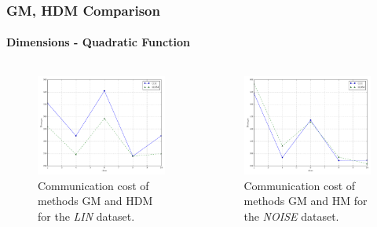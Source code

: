 \documentclass[hyperref={pdfpagelabels=false}]{beamer}
\begin{document}
\begin{frame} \frametitle{GM, HDM Comparison}\framesubtitle{Dimensions - Quadratic Function}
\begin{columns}
\begin{column}[t]{0.5\linewidth}
\begin{figure}
\vspace{-1cm}
\centering
  \includegraphics[scale=0.25]{../img/main_msg_linear_dims.pdf}
  \caption{Communication cost of methods GM and HDM for the \emph{LIN} dataset.}
\end{figure}
\end{column}
\begin{column}[t]{0.5\linewidth}
\begin{figure}
\vspace{-1cm}
\centering
  \includegraphics[scale=0.25]{../img/main_msg_noisyinterweaving_dims.pdf}
  \caption{Communication cost of methods GM and HM for the \emph{NOISE} dataset.}
\end{figure}
\end{column}
\end{columns}
\end{frame}
 
\end{document}
